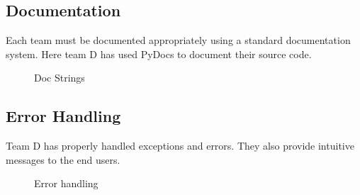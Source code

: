 \subsection{Documentation}
\begin{flushleft}
    Each team must be documented appropriately using a standard documentation system. Here team D has used PyDocs to document their source code.
    \begin{figure}[h!]
        \centering
        \vspace{.5cm}
        \caption{Doc Strings}
        \label{fig:docstrings }
    \end{figure}
\end{flushleft}
\subsection{Error Handling}
\begin{flushleft}
    Team D has properly handled exceptions and errors. They also provide intuitive messages to the end users.
    \begin{figure}[h!]
        \centering
        \vspace{.5cm}
        \caption{Error handling}
        \label{fig:errpr handelling }
    \end{figure}
\end{flushleft}
